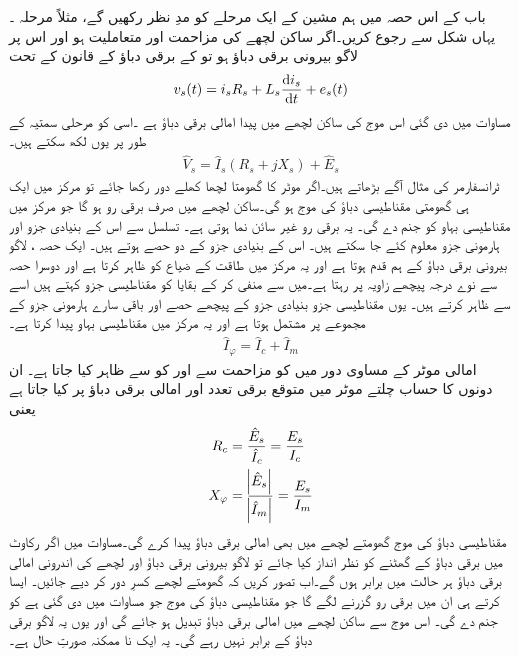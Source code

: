 باب کے اس حصہ میں ہم مشین کے ایک مرحلے کو مدِ نظر رکھیں گے، مثلاً مرحلہ  ۔ یہاں شکل   سے رجوع کریں۔اگر ساکن لچھے کی مزاحمت  اور متعاملیت  ہو اور اس پر لاگو بیرونی برقی دباؤ  ہو تو  کے برقی دباؤ کے قانون کے تحت
\begin{align}
v_s(t)=i_s R_s +L_s \frac{\dif i_s}{\dif t}+e_s(t)
\end{align}
 مساوات   میں دی گئی اس موج کی ساکن لچھے میں پیدا امالی برقی دباؤ ہے ۔اسی کو مرحلی سمتیہ کے طور پر یوں لکھ سکتے ہیں۔
\begin{align}\label{مساوات_امالی_دوری_موٹر_مساوات}
\hat{V}_s=\hat{I}_s \left(R_s+j X_s \right)+\hat{E}_s
\end{align}
ٹرانسفارمر کی مثال آگے بڑھاتے ہیں۔اگر موٹر کا گھومتا لچھا کھلے دور رکھا جائے تو مرکز میں ایک ہی گھومتی مقناطیسی دباؤ کی موج  ہو گی۔ساکن لچھے میں صرف برقی رو  ہو گا جو مرکز میں مقناطیسی بہاو  کو جنم دے گی۔ یہ برقی رو  غیر سائن نما ہوتی ہے۔  تسلسل سے اس کے بنیادی جزو اور ہارمونی جزو معلوم کئے جا سکتے ہیں۔ اس کے بنیادی جزو کے دو حصے ہوتے ہیں۔ ایک حصہ  ، لاگو بیرونی برقی دباؤ  کے ہم قدم ہوتا ہے اور یہ مرکز میں طاقت کے ضیاع کو ظاہر کرتا ہے اور دوسرا حصہ  سے نوے درجہ پیچھے زاویہ پر رہتا ہے۔میں سے  منفی کر کے بقایا کو مقناطیسی جزو کہتے ہیں اسے  سے ظاہر کرتے ہیں۔ یوں مقناطیسی جزو بنیادی جزو کے پیچھے حصے اور باقی سارے ہارمونی جزو کے مجموعے پر مشتمل ہوتا ہے اور یہ مرکز میں مقناطیسی بہاو  پیدا کرتا ہے۔
\begin{align}
\hat{I}_\varphi=\hat{I}_c+\hat{I}_m
\end{align}
 امالی موٹر کے مساوی دور میں  کو مزاحمت  سے اور  کو  سے ظاہر کیا جاتا ہے۔ ان دونوں کا حساب چلتے موٹر میں متوقع برقی تعدد  اور امالی برقی دباؤ  پر کیا جاتا ہے یعنی
\begin{gather}
\begin{aligned}
R_c&=\frac{\hat{E}_s}{\hat{I}_c}=\frac{E_s}{I_c}\\
X_\varphi&=\frac{\abs{\hat{E}_s}}{\abs{\hat{I}_m}}=\frac{E_s}{I_m}
\end{aligned}
\end{gather}
مقناطیسی دباؤ کی موج  گھومتے لچھے میں بھی امالی برقی دباؤ پیدا کرے گی۔مساوات   میں اگر رکاوٹ میں برقی دباؤ کے گھٹنے کو نظر انداز کیا جائے تو لاگو بیرونی برقی دباؤ اور لچھے کی اندرونی امالی برقی دباؤ ہر حالت میں برابر ہوں گے۔اب تصور کریں کہ گھومتے لچھے کسرِ دور کر دیے جائیں۔ ایسا کرتے ہی ان میں برقی رو گزرنے لگے گا جو مقناطیسی دباؤ کی موج   جو مساوات   میں دی گئی ہے کو جنم دے گی۔ اس موج سے ساکن لچھے میں امالی برقی دباؤ  تبدیل ہو جائے گی اور یوں یہ لاگو برقی دباؤ کے برابر نہیں رہے گی۔ یہ ایک نا ممکنہ صورتِ حال ہے۔

